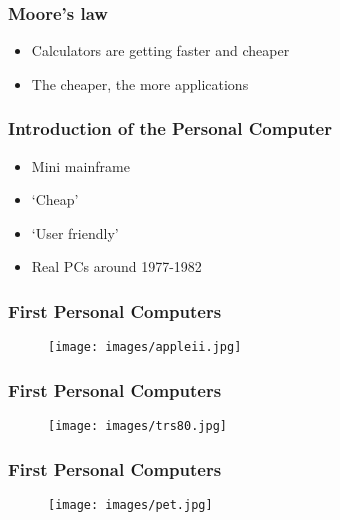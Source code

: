 \documentclass[aspectratio=43]{uva-inf-presentation}
\begin{document}
\begin{frame}
\frametitle{Moore's law}

\begin{itemize}
\item Calculators are getting faster and cheaper
\item The cheaper, the more applications
\end{itemize}

\end{frame}


\begin{frame}
\frametitle{Introduction of the Personal Computer}

\begin{itemize}
\item Mini mainframe
\item `Cheap'
\item `User friendly'
\item Real PCs around 1977-1982
\end{itemize}

\end{frame}


\begin{frame}
\frametitle{First Personal Computers}

\begin{figure}
\texttt{[image: images/appleii.jpg]}
\end{figure}

\end{frame}


\begin{frame}
\frametitle{First Personal Computers}

\begin{figure}
\texttt{[image: images/trs80.jpg]}
\end{figure}

\end{frame}


\begin{frame}
\frametitle{First Personal Computers}

\begin{figure}
\texttt{[image: images/pet.jpg]}
\end{figure}

\end{frame}
\end{document}
